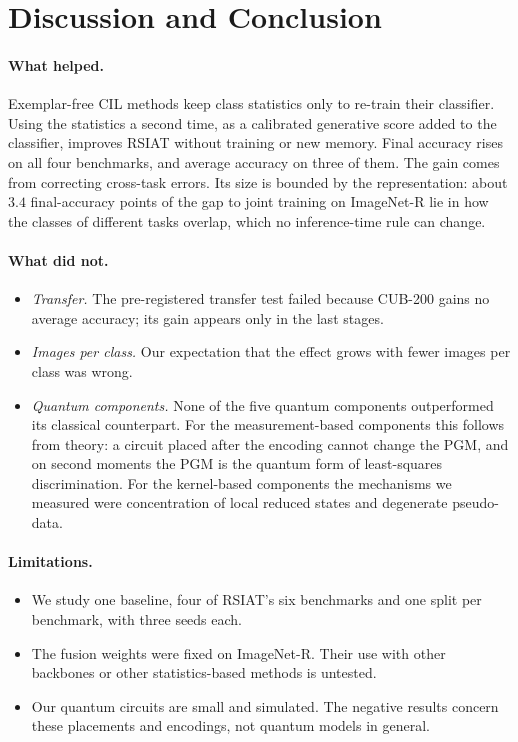 \section{Discussion and Conclusion}
\label{sec:conclusion}

\paragraph{What helped.}
Exemplar-free CIL methods keep class statistics only to re-train their
classifier. Using the statistics a second time, as a calibrated generative
score added to the classifier, improves RSIAT without training or new
memory. Final accuracy rises on all four benchmarks, and average accuracy on
three of them. The gain comes from correcting cross-task errors. Its size is
bounded by the representation: about $3.4$ final-accuracy points of the gap
to joint training on ImageNet-R lie in how the classes of different tasks
overlap, which no inference-time rule can change.

\paragraph{What did not.}
\begin{itemize}
  \item \emph{Transfer.} The pre-registered transfer test failed because
    CUB-200 gains no average accuracy; its gain appears only in the last
    stages.
  \item \emph{Images per class.} Our expectation that the effect grows with
    fewer images per class was wrong.
  \item \emph{Quantum components.} None of the five quantum components
    outperformed its classical counterpart. For the measurement-based
    components this follows from theory: a circuit placed after the encoding
    cannot change the PGM, and on second moments the PGM is the quantum form
    of least-squares discrimination. For the kernel-based components the
    mechanisms we measured were concentration of local reduced states and
    degenerate pseudo-data.
\end{itemize}

\paragraph{Limitations.}
\begin{itemize}
  \item We study one baseline, four of RSIAT's six benchmarks and one split
    per benchmark, with three seeds each.
  \item The fusion weights were fixed on ImageNet-R. Their use with other
    backbones or other statistics-based methods is untested.
  \item Our quantum circuits are small and simulated. The negative results
    concern these placements and encodings, not quantum models in general.
\end{itemize}

